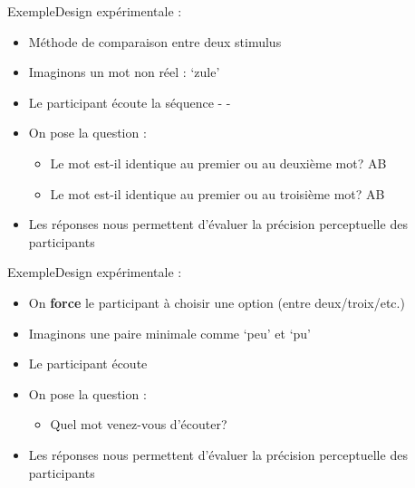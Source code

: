 \documentclass[xcolor=dvipsnames, onlymath, 10pt, aspectratio=169, handout]{beamer}
\begin{document}
\begin{frame}{Exemple}{Design expérimentale : }

	\begin{itemize}
		\item Méthode de comparaison entre deux stimulus
		\item Imaginons un mot non réel : `zule' 

		      \pause
		\item Le participant écoute la séquence  - \ur{zyl} - 
		\item[\winner] On pose la question :

		      \begin{itemize}
			      \item Le  mot est-il identique au premier ou au deuxième mot?   \hfill AB

			            \pause
			      \item Le  mot est-il identique au premier ou au troisième mot?   \hfill AB
		      \end{itemize}

		      \pause

		\item Les réponses nous permettent d'évaluer la précision perceptuelle des participants

	\end{itemize}

\end{frame}





\begin{frame}{Exemple}{Design expérimentale : }

	\begin{itemize}
		\item On \textbf{force} le participant à choisir une option (entre deux/troix/etc.)

		      \pause
		\item Imaginons une paire minimale comme `peu'  et `pu' 

		      \pause
		\item Le participant écoute 
		\item[\winner] On pose la question :

		      \begin{itemize}
			      \item Quel mot venez-vous d'écouter?  
		      \end{itemize}


		\item Les réponses nous permettent d'évaluer la précision perceptuelle des participants

	\end{itemize}

\end{frame}
\end{document}
